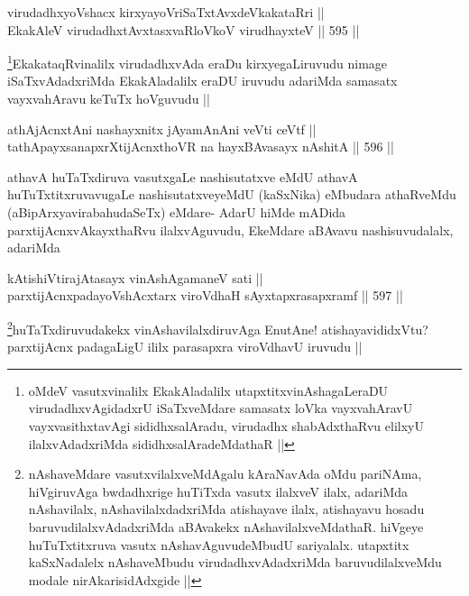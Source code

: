 
\begin{shl}
virudadhxyoVshacx kirxyayoVriSaTxtAvxdeVkakataRri || \\
EkakAleV virudadhxtAvxtasxvaRloVkoV virudhayxteV ||  595 ||  
\end{shl}

\begin{artha}
\footnote{oMdeV vasutxvinalilx EkakAladalilx utapxtitxvinAshagaLeraDU virudadhxvAgidadxrU iSaTxveMdare samasatx loVka vayxvahAravU vayxvasithxtavAgi sididhxsalAradu, virudadhx shabAdxthaRvu elilxyU ilalxvAdadxriMda sididhxsalAradeMdathaR ||}EkakataqRvinalilx virudadhxvAda eraDu kirxyegaLiruvudu nimage iSaTxvAdadxriMda EkakAladalilx eraDU iruvudu adariMda samasatx vayxvahAravu keTuTx hoVguvudu ||
\end{artha}


\begin{shl}
athAjAcnxtAni nashayxnitx jAyamAnAni veVti ceVtf || \\
tathA\s payxsanapxrXtijAcnxthoVR na hayxBAvasayx nAshitA ||  596 ||  
\end{shl}

\begin{artha}
athavA huTaTxdiruva vasutxgaLe nashisutatxve eMdU athavA huTuTxtitxruvavugaLe nashisutatxveyeMdU (kaSxNika) eMbudara athaRveMdu (aBipArxyavirabahudaSeTx) eMdare- AdarU hiMde mADida parxtijAcnxvAkayxthaRvu ilalxvAguvudu, EkeMdare aBAvavu nashisuvudalalx, adariMda
\end{artha}


\begin{shl}
kA\s tishiVtirajAtasayx vinAshAgamaneV sati ||  \\
parxtijAcnxpadayoVshAcxtarx viroVdhaH sAyxtapxrasapxramf ||  597 ||  
\end{shl}

\begin{artha}
\footnote{nAshaveMdare vasutxvilalxveMdAgalu kAraNavAda oMdu pariNAma, hiVgiruvAga bwdadhxrige huTiTxda vasutx ilalxveV ilalx, adariMda nAshavilalx, nAshavilalxdadxriMda atishayave ilalx, atishayavu hosadu baruvudilalxvAdadxriMda aBAvakekx nAshavilalxveMdathaR. hiVgeye huTuTxtitxruva vasutx nAshavAguvudeMbudU sariyalalx. utapxtitx kaSxNadalelx nAshaveMbudu virudadhxvAdadxriMda baruvudilalxveMdu modale nirAkarisidAdxgide ||}huTaTxdiruvudakekx vinAshavilalxdiruvAga EnutAne! atishayavididxVtu? parxtijAcnx padagaLigU ililx parasapxra viroVdhavU iruvudu ||
\end{artha}

